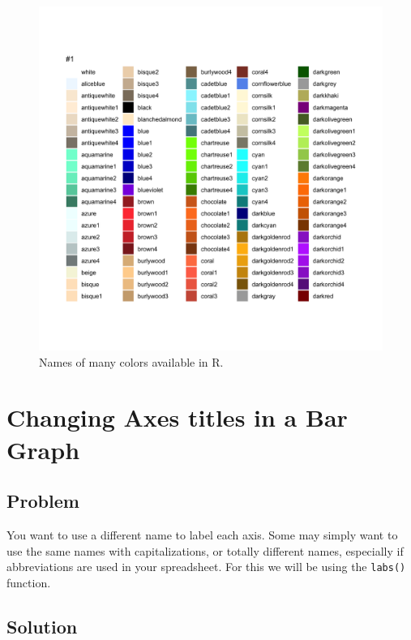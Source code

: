 \documentclass[
]{book}
\begin{document}
\begin{figure}

{\centering \includegraphics[width=18.67in]{images/chapter-6/color_names} 

}

\caption[Names of many colors available in R]{Names of many colors available in R.}\label{fig:FIG-COLOR-NAMES}
\end{figure}

\hypertarget{BAR-GRAPH-AXES}{%
\section{Changing Axes titles in a Bar Graph}\label{BAR-GRAPH-AXES}}

\hypertarget{problem-18}{%
\subsection{Problem}\label{problem-18}}

You want to use a different name to label each axis. Some may simply want to use the same names with capitalizations, or totally different names, especially if abbreviations are used in your spreadsheet. For this we will be using the \texttt{labs()} function.

\hypertarget{solution-18}{%
\subsection{Solution}\label{solution-18}}
\end{document}
